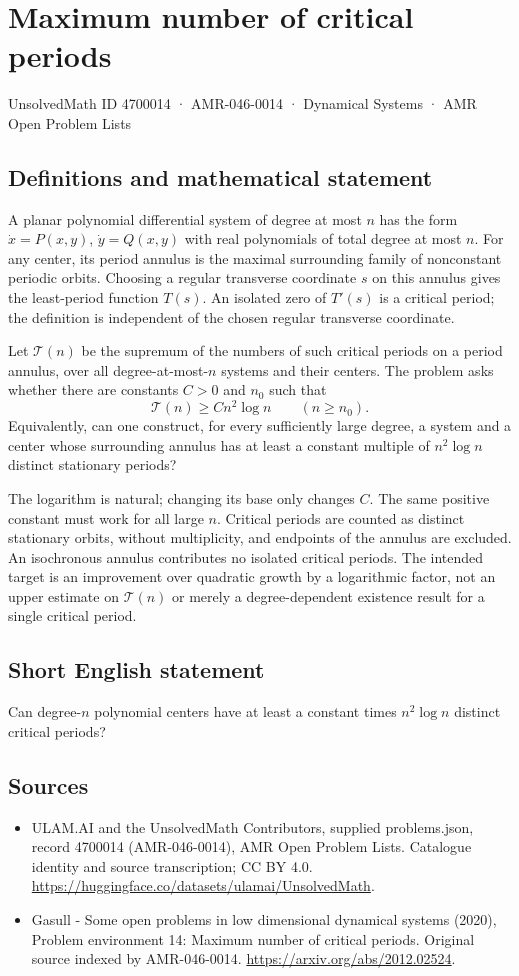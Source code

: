 \documentclass[11pt,a4paper]{article}
\begin{document}
\section*{Maximum number of critical periods}\label{4700014}
{\small UnsolvedMath ID 4700014 · AMR-046-0014 · Dynamical Systems · AMR Open Problem Lists}
\subsection{Definitions and mathematical statement}
A planar polynomial differential system of degree at most $n$ has the form
$\dot x=P(x,y)$, $\dot y=Q(x,y)$ with real polynomials of total degree at
most $n$. For any center, its period annulus is the maximal surrounding
family of nonconstant periodic orbits. Choosing a regular transverse
coordinate $s$ on this annulus gives the least-period function $T(s)$.
An isolated zero of $T'(s)$ is a critical period; the definition is
independent of the chosen regular transverse coordinate.

Let $\mathcal T(n)$ be the supremum of the numbers of such critical periods
on a period annulus, over all degree-at-most-$n$ systems and their centers.
The problem asks whether there are constants $C>0$ and $n_0$ such that
\[
 \mathcal T(n)\ge C n^2\log n\qquad(n\ge n_0).
\]
Equivalently, can one construct, for every sufficiently large degree, a
system and a center whose surrounding annulus has at least a constant
multiple of $n^2\log n$ distinct stationary periods?

The logarithm is natural; changing its base only changes $C$. The same
positive constant must work for all large $n$. Critical periods are counted
as distinct stationary orbits, without multiplicity, and endpoints of the
annulus are excluded. An isochronous annulus contributes no isolated
critical periods. The intended target is an improvement over quadratic
growth by a logarithmic factor, not an upper estimate on $\mathcal T(n)$
or merely a degree-dependent existence result for a single critical period.
\subsection{Short English statement}
Can degree-$n$ polynomial centers have at least a constant times $n^2\log n$ distinct critical periods?
\subsection{Sources}
\begin{itemize}
\item[S1] ULAM.AI and the UnsolvedMath Contributors, supplied problems.json, record 4700014 (AMR-046-0014), AMR Open Problem Lists. Catalogue identity and source transcription; CC BY 4.0.
\url{https://huggingface.co/datasets/ulamai/UnsolvedMath}.
\item[S2] Gasull - Some open problems in low dimensional dynamical systems (2020), Problem environment 14: Maximum number of critical periods. Original source indexed by AMR-046-0014.
\url{https://arxiv.org/abs/2012.02524}.
\end{itemize}
\end{document}

